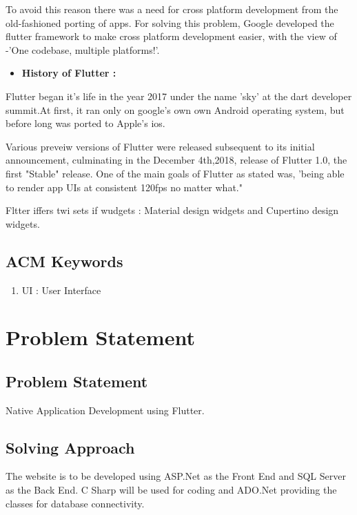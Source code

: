 \documentclass[11pt,a4paper,oneside,openright]{report}
\begin{document}
{{\hspace{0.2in} To avoid this reason there was a need for cross platform development from the old-fashioned porting of apps. For solving this problem, Google developed the flutter framework to make cross platform development easier, with the view of -'One codebase, multiple platforms!'.
			

\begin{itemize}

\item {\bf History of Flutter : }
\end{itemize}
\hspace{0.2in} Flutter began it's life in the year 2017 under the name 'sky' at the dart developer summit.At first, it ran only on google's own own Android operating system, but before long was ported to Apple's ios. 

\hspace{0.2in} Various preveiw versions of Flutter were released subsequent to its initial announcement, culminating in the December  4th,2018, release of Flutter 1.0, the first "Stable" release. One of the main goals of Flutter as stated was, 'being able to render app UIs at consistent 120fps no matter what."

\hspace{0.2in} Fltter iffers twi sets if wudgets : Material design widgets and Cupertino design widgets.

\section{ACM Keywords}
 \begin{enumerate}
 \item UI : User Interface
 \end{enumerate}


\chapter{Problem Statement}\label{chap:project outline}

\section{Problem Statement}
 Native Application Development using Flutter.
\section{Solving Approach}
The website is to be developed using ASP.Net as the Front End and SQL Server as the Back End.
 C Sharp will be used for coding and ADO.Net providing the classes for database connectivity.

}}
\end{document}
